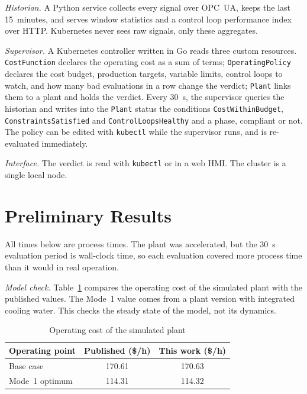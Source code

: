 \documentclass[conference]{IEEEtran}
\begin{document}
\textit{Historian.} A Python service collects every signal over OPC~UA, keeps the last 15~minutes, and serves window statistics and a control loop performance index \cite{Bradu2018} over HTTP. Kubernetes never sees raw signals, only these aggregates.

\textit{Supervisor.} A Kubernetes controller written in Go reads three custom resources. \texttt{CostFunction} declares the operating cost as a sum of terms; \texttt{OperatingPolicy} declares the cost budget, production targets, variable limits, control loops to watch, and how many bad evaluations in a row change the verdict; \texttt{Plant} links them to a plant and holds the verdict. Every 30~s, the supervisor queries the historian and writes into the \texttt{Plant} status the conditions \texttt{CostWithinBudget}, \texttt{ConstraintsSatisfied} and \texttt{ControlLoopsHealthy} and a phase, compliant or not. The policy can be edited with \texttt{kubectl} while the supervisor runs, and is re-evaluated immediately.

\textit{Interface.} The verdict is read with \texttt{kubectl} or in a web HMI. The cluster is a single local node.

\section{Preliminary Results}
\label{sec:results}

All times below are process times. The plant was accelerated, but the 30~s evaluation period is wall-clock time, so each evaluation covered more process time than it would in real operation.

\textit{Model check.} Table~\ref{tab:calib} compares the operating cost of the simulated plant with the published values. The Mode~1 value comes from a plant version with integrated cooling water. This checks the steady state of the model, not its dynamics.

\begin{table}[t]
\caption{Operating cost of the simulated plant}
\label{tab:calib}
\centering
\footnotesize
\begin{tabular}{@{}lcc@{}}
\toprule
Operating point & Published (\$/h) & This work (\$/h) \\
\midrule
Base case \cite{DOWNS1993} & 170.61 & 170.63 \\
Mode~1 optimum \cite{Ricker1995} & 114.31 & 114.32 \\
\bottomrule
\end{tabular}
\end{table}
\end{document}

